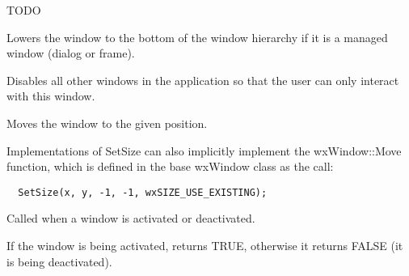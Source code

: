 TODO

\label{wxwindowlower}


Lowers the window to the bottom of the window hierarchy if it is a managed window (dialog
or frame).

\label{wxwindowmakemodal}


Disables all other windows in the application so that
the user can only interact with this window.



\label{wxwindowmove}


Moves the window to the given position.





Implementations of SetSize can also implicitly implement the
wxWindow::Move function, which is defined in the base wxWindow class
as the call:

\begin{verbatim}
  SetSize(x, y, -1, -1, wxSIZE_USE_EXISTING);
\end{verbatim}



\label{wxwindowonactivate}


Called when a window is activated or deactivated.




If the window is being activated,  returns TRUE,
otherwise it returns FALSE (it is being deactivated).

